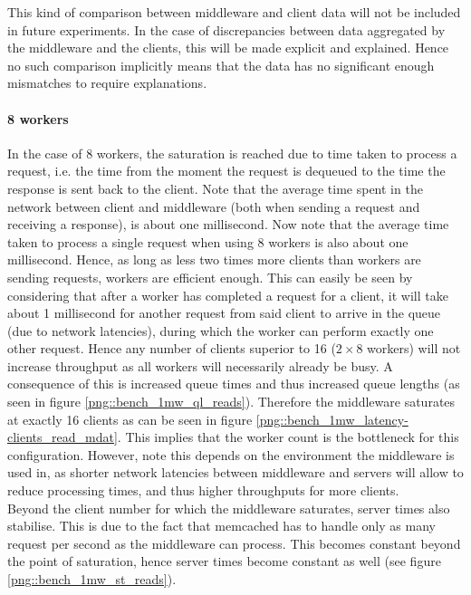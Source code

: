 \documentclass[11pt,a4paper]{article}
\begin{document}
This kind of comparison between middleware and client data will not be included in future experiments. In the case of discrepancies between data aggregated by the middleware and the clients, this will be made explicit and explained. Hence no such comparison implicitly means that the data has no significant enough mismatches to require explanations.

\paragraph{8 workers}
In the case of 8 workers, the saturation is reached due to time taken to process a request, i.e. the time from the moment the request is dequeued to the time the response is sent back to the client. Note that the average time spent in the network between client and middleware (both when sending a request and receiving a response), is about one millisecond. Now note that the average time taken to process a single request when using 8 workers is also about one millisecond. Hence, as long as less two times more clients than workers are sending requests, workers are efficient enough. This can easily be seen by considering that after a worker has completed a request for a client, it will take about 1 millisecond for another request from said client to arrive in the queue (due to network latencies), during which the worker can perform exactly one other request. Hence any number of clients superior to 16 ($2\times8$ workers) will not increase throughput as all workers will necessarily already be busy. A consequence of this is increased queue times and thus increased queue lengths (as seen in figure \ref{png::bench_1mw_ql_reads}). Therefore the middleware saturates at exactly 16 clients as can be seen in figure \ref{png::bench_1mw_latency-clients_read_mdat}. This implies that the worker count is the bottleneck for this configuration. However, note this depends on the environment the middleware is used in, as shorter network latencies between middleware and servers will allow to reduce processing times, and thus higher throughputs for more clients.\\
\indent Beyond the client number for which the middleware saturates, server times also stabilise. This is due to the fact that memcached has to handle only as many request per second as the middleware can process. This becomes constant beyond the point of saturation, hence server times become constant as well (see figure \ref{png::bench_1mw_st_reads}).
\end{document}
